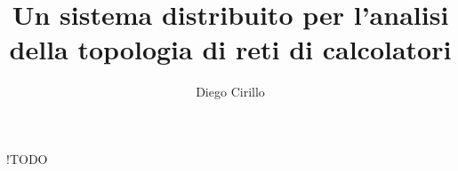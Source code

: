 \documentclass[target=bach,aauheader=,style=]{thud}
\title{Un sistema distribuito per l'analisi della topologia di reti di calcolatori}
\author{Diego Cirillo}
\begin{document}
\maketitle




\tableofcontents


\listoffigures
!TODO

\mainmatter

\end{document}
